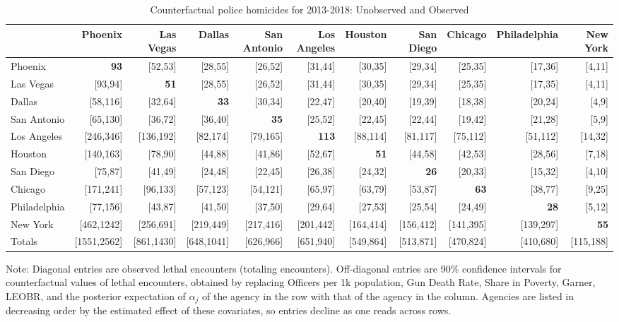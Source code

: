 \begin{table}[h!]\centering\scriptsize\tabcolsep=0.1cm\caption{Counterfactual police homicides for 2013-2018: Unobserved and Observed} \label{table:counterfactual_unobs_obs}\begin{tabular}{lrrrrrrrrrr}\hline \hline&Phoenix&Las Vegas&Dallas&San Antonio&Los Angeles&Houston&San Diego&Chicago&Philadelphia&New York\\
\hline
Phoenix&\textbf{93}&[52,53]&[28,55]&[26,52]&[31,44]&[30,35]&[29,34]&[25,35]&[17,36]&[4,11]\\
Las Vegas&[93,94]&\textbf{51}&[28,55]&[26,52]&[31,44]&[30,35]&[29,34]&[25,35]&[17,35]&[4,11]\\
Dallas&[58,116]&[32,64]&\textbf{33}&[30,34]&[22,47]&[20,40]&[19,39]&[18,38]&[20,24]&[4,9]\\
San Antonio&[65,130]&[36,72]&[36,40]&\textbf{35}&[25,52]&[22,45]&[22,44]&[19,42]&[21,28]&[5,9]\\
Los Angeles&[246,346]&[136,192]&[82,174]&[79,165]&\textbf{113}&[88,114]&[81,117]&[75,112]&[51,112]&[14,32]\\
Houston&[140,163]&[78,90]&[44,88]&[41,86]&[52,67]&\textbf{51}&[44,58]&[42,53]&[28,56]&[7,18]\\
San Diego&[75,87]&[41,49]&[24,48]&[22,45]&[26,38]&[24,32]&\textbf{26}&[20,33]&[15,32]&[4,10]\\
Chicago&[171,241]&[96,133]&[57,123]&[54,121]&[65,97]&[63,79]&[53,87]&\textbf{63}&[38,77]&[9,25]\\
Philadelphia&[77,156]&[43,87]&[41,50]&[37,50]&[29,64]&[27,53]&[25,54]&[24,49]&\textbf{28}&[5,12]\\
New York&[462,1242]&[256,691]&[219,449]&[217,416]&[201,442]&[164,414]&[156,412]&[141,395]&[139,297]&\textbf{55}\\
\hline
Totals&[1551,2562]&[861,1430]&[648,1041]&[626,966]&[651,940]&[549,864]&[513,871]&[470,824]&[410,680]&[115,188]\\
\hline 
 \end{tabular} 
 \begin{center} 
 \begin{minipage}{1.05\textwidth} %
 {\footnotesize Note: Diagonal entries are observed lethal encounters (totaling \totalincidentsten{} encounters). Off-diagonal entries are 90\% confidence intervals for counterfactual values of lethal encounters, obtained by replacing Officers per 1k population, Gun Death Rate, Share in Poverty, Garner, LEOBR, and the posterior expectation of $\alpha_j$ of the agency in the row with that of the agency in the column. Agencies are listed in decreasing order by the estimated effect of these covariates, so entries decline as one reads across rows.} 
 \end{minipage} 
 \end{center} 
 \end{table}